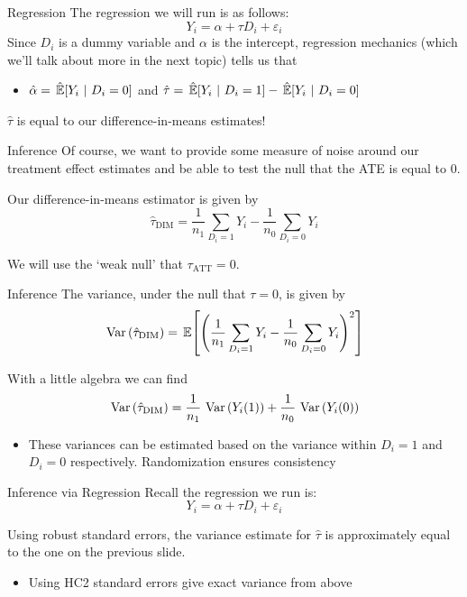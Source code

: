 \documentclass[aspectratio=169,t,11pt,table]{beamer}
\begin{document}
\begin{frame}{Regression}
  The regression we will run is as follows:
  $$
    Y_i = \alpha + \tau D_i + \varepsilon_i
  $$
  Since $D_i$ is a dummy variable and $\alpha$ is the intercept, regression mechanics (which we'll talk about more in the next topic) tells us that 
  \begin{itemize}
    \item $\hat{\alpha} = \expechat{Y_i}{D_i = 0}$ and $\hat{\tau} = \expechat{Y_i}{D_i = 1} - \expechat{Y_i}{D_i = 0}$
  \end{itemize}

  \bigskip
  $\hat{\tau}$ is equal to our difference-in-means estimates! 
\end{frame}

\begin{frame}{Inference}
  Of course, we want to provide some measure of noise around our treatment effect estimates and be able to test the null that the ATE is equal to 0. 
  
  \bigskip
  Our difference-in-means estimator is given by
  $$
    \hat{\tau}_{\text{DIM}} = \frac{1}{n_1} \sum_{D_i = 1} Y_i - \frac{1}{n_0} \sum_{D_i = 0} Y_i
  $$

	\bigskip
  We will use the `weak null' that $\tau_{\text{ATT}} = 0$. 
\end{frame}

\begin{frame}{Inference}
  The variance, under the null that $\tau = 0$, is given by
  $$
    \var{\hat{\tau}_{\text{DIM}}} = \expec{ \left( \frac{1}{n_1} \sum_{D_i = 1} Y_i - \frac{1}{n_0} \sum_{D_i = 0} Y_i \right)^2 }
  $$

  With a little algebra we can find
	\begin{align*}
		\var{\hat{\tau}_{\text{DIM}}} = \frac{1}{n_1} \var{Y_{i}(1)} + \frac{1}{n_0} \var{Y_{i}(0)}
	\end{align*}
	\begin{itemize}
		\item These variances can be estimated based on the variance within $D_i =
			1$ and $D_i = 0$ respectively. Randomization ensures consistency
	\end{itemize}
\end{frame}

\begin{frame}{Inference via Regression}
  Recall the regression we run is: 
	$$
    Y_i = \alpha + \tau D_i + \varepsilon_i
  $$

	Using robust standard errors, the variance estimate for $\hat{\tau}$ is approximately equal to the one on the previous slide. 
	\begin{itemize}
		\item Using HC2 standard errors give exact variance from above
	\end{itemize}
\end{frame}
\end{document}
